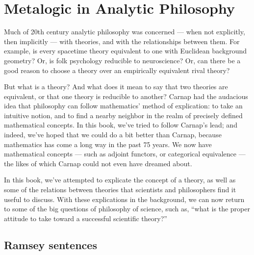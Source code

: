 \chapter{Metalogic in Analytic Philosophy} \label{chap-realism}


Much of 20th century analytic philosophy was concerned --- when not
explicitly, then implicitly --- with theories, and with the
relationships between them.  For example, is every spacetime theory
equivalent to one with Euclidean background geometry?  Or, is folk
psychology reducible to neuroscience?  Or, can there be a good reason
to choose a theory over an empirically equivalent rival theory?

But what is a theory?  And what does it mean to say that two theories
are equivalent, or that one theory is reducible to another?  Carnap
had the audacious idea that philosophy can follow mathematics' method
of explication: to take an intuitive notion, and to find a nearby
neighbor in the realm of precisely defined mathematical concepts.  In
this book, we've tried to follow Carnap's lead; and indeed, we've
hoped that we could do a bit better than Carnap, because mathematics
has come a long way in the past 75 years.  We now have mathematical
concepts --- such as adjoint functors, or categorical equivalence ---
the likes of which Carnap could not even have dreamed about.

In this book, we've attempted to explicate the concept of a theory, as
well as some of the relations between theories that scientists and
philosophers find it useful to discuss.  With these explications in
the background, we can now return to some of the big questions of
philosophy of science, such as, ``what is the proper attitude to take
toward a successful scientific theory?''



\section{Ramsey sentences} \label{ramsey}



